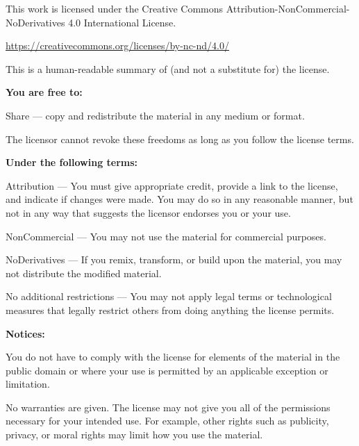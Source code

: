 \begin{centering}

{\Large\ccbyncnd}

This work is licensed under the Creative Commons
Attribution-NonCommercial-NoDerivatives 4.0 International License.

\href{https://creativecommons.org/licenses/by-nc-nd/4.0/}{https://creativecommons.org/licenses/by-nc-nd/4.0/}

\end{centering}

This is a human-readable summary of (and not a substitute for) the license.

\textbf{You are free to:}

\begin{licenseitemize}

\item Share — copy and redistribute the material in any medium or format.

\end{licenseitemize}

The licensor cannot revoke these freedoms as long as you follow the license
terms.

\textbf{Under the following terms:}

\begin{licenseitemize}

\item Attribution --- You must give appropriate credit, provide a link to the
license, and indicate if changes were made. You may do so in any reasonable
manner, but not in any way that suggests the licensor endorses you or your
use.

\item NonCommercial --- You may not use the material for commercial purposes.

\item NoDerivatives --- If you remix, transform, or build upon the material,
you may not distribute the modified material.

\end{licenseitemize}

No additional restrictions --- You may not apply legal terms or technological
measures that legally restrict others from doing anything the license permits.

\textbf{Notices:}

You do not have to comply with the license for elements of the material in the
public domain or where your use is permitted by an applicable exception or
limitation.

No warranties are given. The license may not give you all of the permissions
necessary for your intended use. For example, other rights such as publicity,
privacy, or moral rights may limit how you use the material.

